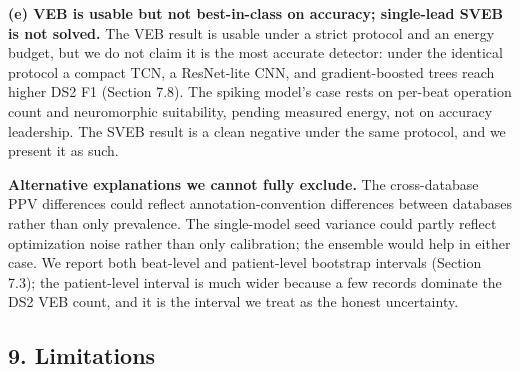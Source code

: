 \documentclass[
]{article}
\begin{document}
\textbf{(e) VEB is usable but not best-in-class on accuracy; single-lead
SVEB is not solved.} The VEB result is usable under a strict protocol
and an energy budget, but we do not claim it is the most accurate
detector: under the identical protocol a compact TCN, a ResNet-lite CNN,
and gradient-boosted trees reach higher DS2 F1 (Section 7.8). The
spiking model's case rests on per-beat operation count and neuromorphic
suitability, pending measured energy, not on accuracy leadership. The
SVEB result is a clean negative under the same protocol, and we present
it as such.

\textbf{Alternative explanations we cannot fully exclude.} The
cross-database PPV differences could reflect annotation-convention
differences between databases rather than only prevalence. The
single-model seed variance could partly reflect optimization noise
rather than only calibration; the ensemble would help in either case. We
report both beat-level and patient-level bootstrap intervals (Section
7.3); the patient-level interval is much wider because a few records
dominate the DS2 VEB count, and it is the interval we treat as the
honest uncertainty.

\subsection{9. Limitations}\label{limitations}
\end{document}
